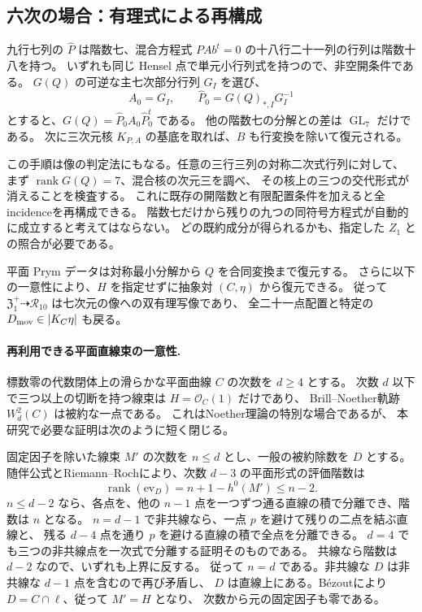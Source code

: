 \subsection{六次の場合：有理式による再構成}
九行七列の $\widehat P$ は階数七、混合方程式 $PAb^t=0$ の十八行二十一列の行列は階数十八を持つ。
いずれも同じ Hensel 点で単元小行列式を持つので、非空開条件である。
$G(Q)$ の可逆な主七次部分行列 $G_I$ を選び、
\[
 A_0=G_I,\qquad \widehat P_0=G(Q)_{*,I}G_I^{-1}
\]
とすると、$G(Q)=\widehat P_0A_0\widehat P_0^t$ である。
他の階数七の分解との差は $\operatorname{GL}_7$ だけである。
次に三次元核 $K_{P,A}$ の基底を取れば、$B$ も行変換を除いて復元される。

この手順は像の判定法にもなる。任意の三行三列の対称二次式行列に対して、
まず $\operatorname{rank}G(Q)=7$、混合核の次元三を調べ、
その核上の三つの交代形式が消えることを検査する。
これに既存の開階数と有限配置条件を加えると全incidenceを再構成できる。
階数七だけから残りの九つの同符号方程式が自動的に成立すると考えてはならない。
どの既約成分が得られるかも、指定した $Z_1$ との照合が必要である。

平面 Prym データは対称最小分解から $Q$ を合同変換まで復元する。
さらに以下の一意性により、$H$ を指定せずに抽象対 $(C,\eta)$ から復元できる。
従って $\mathfrak Z_1^+\dashrightarrow\mathcal R_{10}$ は七次元の像への双有理写像であり、
全二十一点配置と特定の $D_{\rm mov}\in|K_C\eta|$ も戻る。

\paragraph{再利用できる平面直線束の一意性.}
標数零の代数閉体上の滑らかな平面曲線 $C$ の次数を $d\ge4$ とする。
次数 $d$ 以下で三つ以上の切断を持つ線束は $H=\mathcal O_C(1)$ だけであり、
Brill--Noether軌跡 $W_d^2(C)$ は被約な一点である。
これはNoether理論の特別な場合である\cite{HartshorneNoether,CoppensKatoPlaneSystems}が、
本研究で必要な証明は次のように短く閉じる。

固定因子を除いた線束 $M'$ の次数を $n\le d$ とし、一般の被約除数を $D$ とする。
随伴公式とRiemann--Rochにより、次数 $d-3$ の平面形式の評価階数は
\[
 \operatorname{rank}(\mathrm{ev}_D)=n+1-h^0(M')\le n-2.
\]
$n\le d-2$ なら、各点を、他の $n-1$ 点を一つずつ通る直線の積で分離でき、階数は $n$ となる。
$n=d-1$ で非共線なら、一点 $p$ を避けて残りの二点を結ぶ直線と、
残る $d-4$ 点を通り $p$ を避ける直線の積で全点を分離できる。
$d=4$ でも三つの非共線点を一次式で分離する証明そのものである。
共線なら階数は $d-2$ なので、いずれも上界に反する。
従って $n=d$ である。非共線な $D$ は非共線な $d-1$ 点を含むので再び矛盾し、
$D$ は直線上にある。B\'ezoutにより $D=C\cap\ell$、従って $M'=H$ となり、
次数から元の固定因子も零である。

